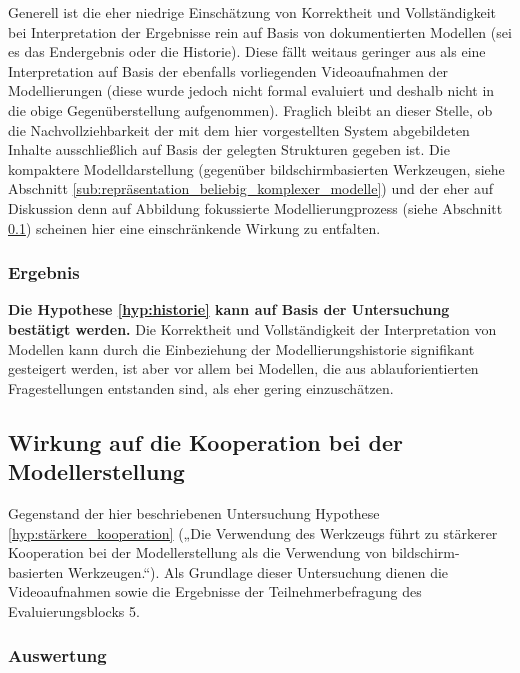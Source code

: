 Generell ist die eher niedrige Einschätzung von Korrektheit und Vollständigkeit bei Interpretation der Ergebnisse rein auf Basis von dokumentierten Modellen (sei es das Endergebnis oder die Historie). Diese fällt weitaus geringer aus als eine Interpretation auf Basis der ebenfalls vorliegenden Videoaufnahmen der Modellierungen (diese wurde jedoch nicht formal evaluiert und deshalb nicht in die obige Gegenüberstellung aufgenommen). Fraglich bleibt an dieser Stelle, ob die Nachvollziehbarkeit der mit dem hier vorgestellten System abgebildeten Inhalte ausschließlich auf Basis der gelegten Strukturen gegeben ist. Die kompaktere Modelldarstellung (gegenüber bildschirmbasierten Werkzeugen, siehe Abschnitt \ref{sub:repräsentation_beliebig_komplexer_modelle}) und der eher auf Diskussion denn auf Abbildung fokussierte Modellierungprozess (siehe Abschnitt \ref{sub:wirkung_auf_die_kooperation_bei_der_modellerstellung}) scheinen hier eine einschränkende Wirkung zu entfalten.

\subsubsection{Ergebnis} 

\textbf{Die Hypothese \ref{hyp:historie} kann auf Basis der Untersuchung bestätigt werden.} Die Korrektheit und Vollständigkeit der Interpretation von Modellen kann durch die Einbeziehung der Modellierungshistorie signifikant gesteigert werden, ist aber vor allem bei Modellen, die aus ablauforientierten Fragestellungen entstanden sind, als eher gering einzuschätzen. 

\subsection{Wirkung auf die Kooperation bei der Modellerstellung} %
\label{sub:wirkung_auf_die_kooperation_bei_der_modellerstellung}

Gegenstand der hier beschriebenen Untersuchung Hypothese \ref{hyp:stärkere_kooperation} („Die Verwendung des Werkzeugs führt zu stärkerer Kooperation bei der Modellerstellung als die Verwendung von bildschirm-basierten Werkzeugen.“). Als Grundlage dieser Untersuchung dienen die Videoaufnahmen sowie die Ergebnisse der Teilnehmerbefragung des Evaluierungsblocks 5.

\subsubsection{Auswertung} %

